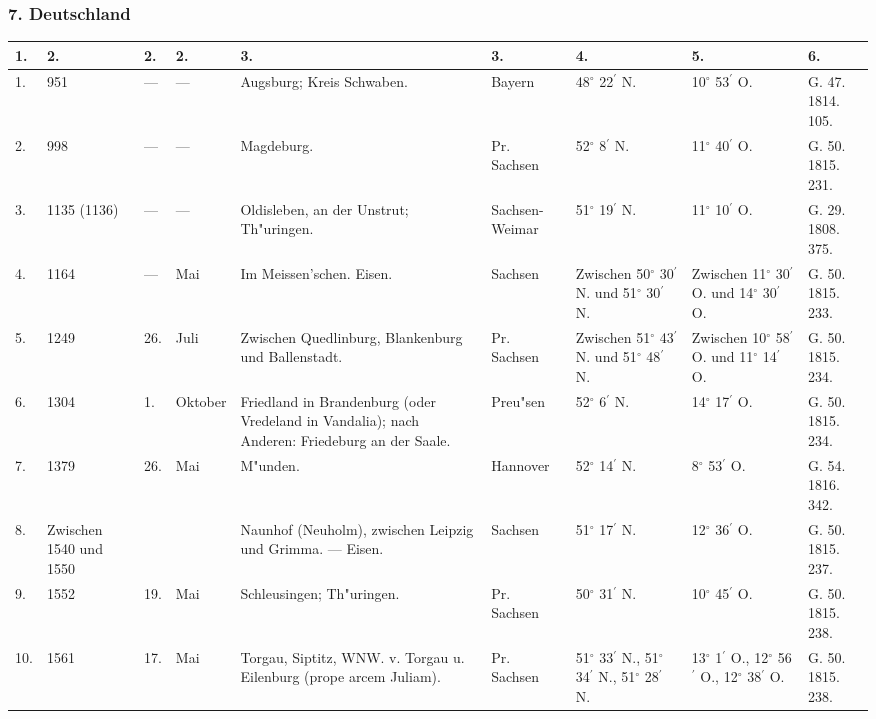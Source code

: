 \documentclass[a4paper, 8pt, oneside, polutonikogreek, german]{article}
\begin{document}
\subsubsection{7. Deutschland}
\begin{center}
    \footnotesize
    \begin{longtable}{|p{3mm}|p{13mm}|p{5mm}|p{16mm}|p{25mm}|p{13mm}|p{13mm}|p{13mm}|p{13mm}|}
    \hline
        1. & 2. & 2. & 2. & 3. & 3. & 4. & 5. & 6. \\ \hline
        1. & 951 & --- & --- & Augsburg; Kreis Schwaben. & Bayern & 48$^\circ$ 22$^\prime$ N. & 10$^\circ$ 53$^\prime$ O. & G. 47. 1814. 105. \\ \hline
        2. & 998 & --- & --- & Magdeburg. & Pr. Sachsen & 52$^\circ$ 8$^\prime$ N. & 11$^\circ$ 40$^\prime$ O. & G. 50. 1815. 231. \\ \hline
        3. & 1135 (1136) & --- & --- & Oldisleben, an der Unstrut; Th"uringen. & Sachsen-Weimar & 51$^\circ$ 19$^\prime$ N. & 11$^\circ$ 10$^\prime$ O. & G. 29. 1808. 375. \\ \hline
        4. & 1164 & --- & Mai & Im Meissen’schen. Eisen. & Sachsen & Zwischen 50$^\circ$ 30$^\prime$ N. und 51$^\circ$ 30$^\prime$ N. & Zwischen 11$^\circ$ 30$^\prime$ O. und 14$^\circ$ 30$^\prime$ O. & G. 50. 1815. 233. \\ \hline
        5. & 1249 & 26. & Juli & Zwischen Quedlinburg, Blankenburg und Ballenstadt. & Pr. Sachsen & Zwischen 51$^\circ$ 43$^\prime$ N. und 51$^\circ$ 48$^\prime$ N. & Zwischen 10$^\circ$ 58$^\prime$ O. und 11$^\circ$ 14$^\prime$ O. & G. 50. 1815. 234. \\ \hline
        6. & 1304 & 1. & Oktober & Friedland in Brandenburg (oder Vredeland in Vandalia); nach Anderen: Friedeburg an der Saale. & Preu"sen & 52$^\circ$ 6$^\prime$ N. & 14$^\circ$ 17$^\prime$ O. & G. 50. 1815. 234. \\ \hline
        7. & 1379 & 26. & Mai & M"unden. & Hannover & 52$^\circ$ 14$^\prime$ N. & 8$^\circ$ 53$^\prime$ O. & G. 54. 1816. 342. \\ \hline
        8. & Zwischen 1540 und 1550 & ~ & ~ & Naunhof (Neuholm), zwischen Leipzig und Grimma. --- Eisen. & Sachsen & 51$^\circ$ 17$^\prime$ N. & 12$^\circ$ 36$^\prime$ O. & G. 50. 1815. 237. \\ \hline
        9. & 1552 & 19. & Mai & Schleusingen; Th"uringen. & Pr. Sachsen & 50$^\circ$ 31$^\prime$ N. & 10$^\circ$ 45$^\prime$ O. & G. 50. 1815. 238. \\ \hline
        10. & 1561 & 17. & Mai & Torgau, Siptitz, WNW. v. Torgau u. Eilenburg (prope arcem Juliam). & Pr. Sachsen & 51$^\circ$ 33$^\prime$ N., 51$^\circ$ 34$^\prime$ N., 51$^\circ$ 28$^\prime$ N. & 13$^\circ$ 1$^\prime$ O., 12$^\circ$ 56$^\prime$ O., 12$^\circ$ 38$^\prime$ O. & G. 50. 1815. 238. \\ \hline

\end{longtable}
\end{center}
\end{document}
